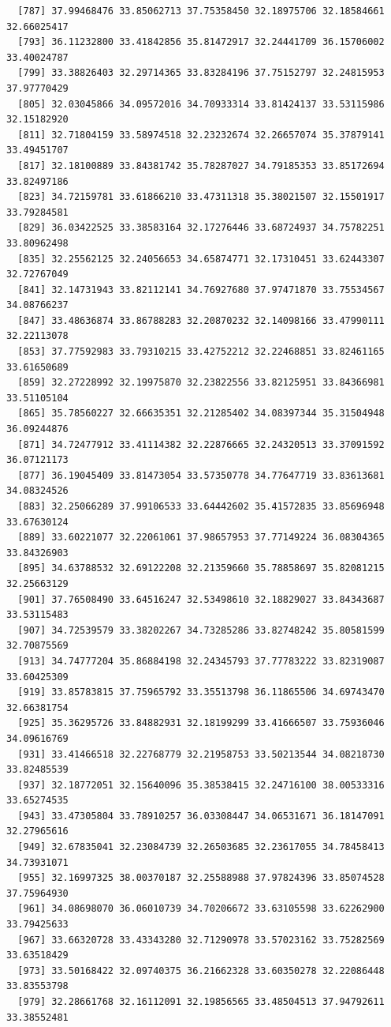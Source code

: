 \documentclass[
  letterpaper,
  DIV=11,
  numbers=noendperiod]{scrartcl}
\begin{document}
\begin{verbatim}
  [787] 37.99468476 33.85062713 37.75358450 32.18975706 32.18584661 32.66025417
  [793] 36.11232800 33.41842856 35.81472917 32.24441709 36.15706002 33.40024787
  [799] 33.38826403 32.29714365 33.83284196 37.75152797 32.24815953 37.97770429
  [805] 32.03045866 34.09572016 34.70933314 33.81424137 33.53115986 32.15182920
  [811] 32.71804159 33.58974518 32.23232674 32.26657074 35.37879141 33.49451707
  [817] 32.18100889 33.84381742 35.78287027 34.79185353 33.85172694 33.82497186
  [823] 34.72159781 33.61866210 33.47311318 35.38021507 32.15501917 33.79284581
  [829] 36.03422525 33.38583164 32.17276446 33.68724937 34.75782251 33.80962498
  [835] 32.25562125 32.24056653 34.65874771 32.17310451 33.62443307 32.72767049
  [841] 32.14731943 33.82112141 34.76927680 37.97471870 33.75534567 34.08766237
  [847] 33.48636874 33.86788283 32.20870232 32.14098166 33.47990111 32.22113078
  [853] 37.77592983 33.79310215 33.42752212 32.22468851 33.82461165 33.61650689
  [859] 32.27228992 32.19975870 32.23822556 33.82125951 33.84366981 33.51105104
  [865] 35.78560227 32.66635351 32.21285402 34.08397344 35.31504948 36.09244876
  [871] 34.72477912 33.41114382 32.22876665 32.24320513 33.37091592 36.07121173
  [877] 36.19045409 33.81473054 33.57350778 34.77647719 33.83613681 34.08324526
  [883] 32.25066289 37.99106533 33.64442602 35.41572835 33.85696948 33.67630124
  [889] 33.60221077 32.22061061 37.98657953 37.77149224 36.08304365 33.84326903
  [895] 34.63788532 32.69122208 32.21359660 35.78858697 35.82081215 32.25663129
  [901] 37.76508490 33.64516247 32.53498610 32.18829027 33.84343687 33.53115483
  [907] 34.72539579 33.38202267 34.73285286 33.82748242 35.80581599 32.70875569
  [913] 34.74777204 35.86884198 32.24345793 37.77783222 33.82319087 33.60425309
  [919] 33.85783815 37.75965792 33.35513798 36.11865506 34.69743470 32.66381754
  [925] 35.36295726 33.84882931 32.18199299 33.41666507 33.75936046 34.09616769
  [931] 33.41466518 32.22768779 32.21958753 33.50213544 34.08218730 33.82485539
  [937] 32.18772051 32.15640096 35.38538415 32.24716100 38.00533316 33.65274535
  [943] 33.47305804 33.78910257 36.03308447 34.06531671 36.18147091 32.27965616
  [949] 32.67835041 32.23084739 32.26503685 32.23617055 34.78458413 34.73931071
  [955] 32.16997325 38.00370187 32.25588988 37.97824396 33.85074528 37.75964930
  [961] 34.08698070 36.06010739 34.70206672 33.63105598 33.62262900 33.79425633
  [967] 33.66320728 33.43343280 32.71290978 33.57023162 33.75282569 33.63518429
  [973] 33.50168422 32.09740375 36.21662328 33.60350278 32.22086448 33.83553798
  [979] 32.28661768 32.16112091 32.19856565 33.48504513 37.94792611 33.38552481

\end{verbatim}
\end{document}
